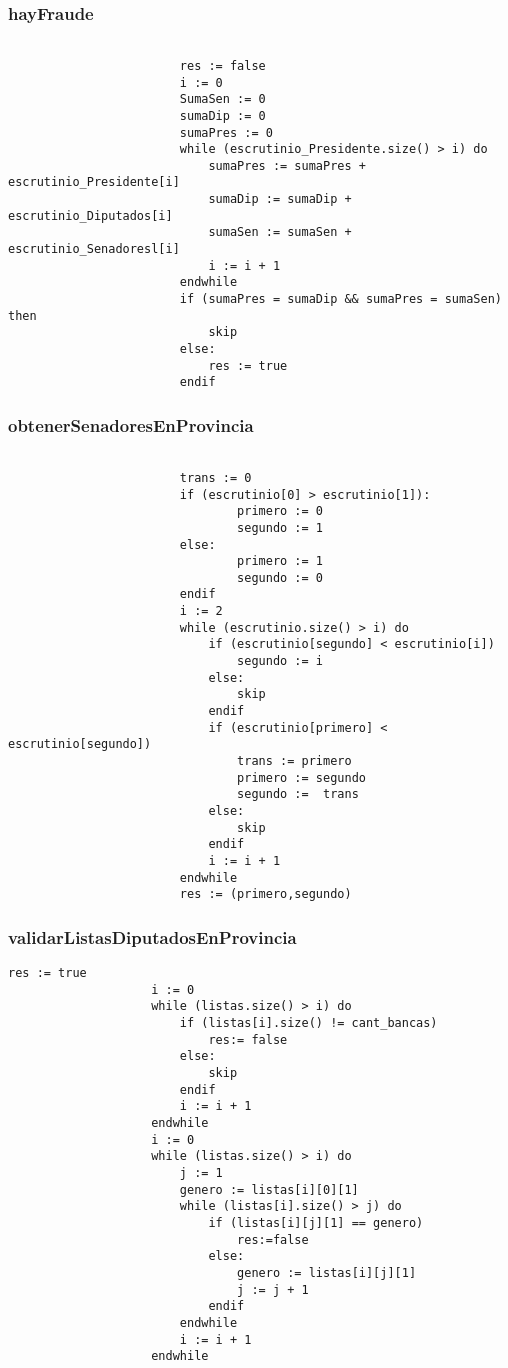 \documentclass[10pt,a4paper]{article}
\begin{document}
		\subsubsection{hayFraude}
			\begin{minipage}[t]{\textwidth}
				\begin{lstlisting}[label=code:for]
    
                        res := false
						i := 0
						SumaSen := 0
						sumaDip := 0
						sumaPres := 0
						while (escrutinio_Presidente.size() > i) do
							sumaPres := sumaPres + escrutinio_Presidente[i]
							sumaDip := sumaDip + escrutinio_Diputados[i]
							sumaSen := sumaSen + escrutinio_Senadoresl[i]
							i := i + 1
						endwhile
						if (sumaPres = sumaDip && sumaPres = sumaSen) then 
							skip
						else:
							res := true
						endif
				\end{lstlisting}
			\end{minipage}

		\subsubsection{obtenerSenadoresEnProvincia}
			\begin{minipage}[t]{\textwidth}
				\begin{lstlisting}[label=code:for]

						trans := 0
						if (escrutinio[0] > escrutinio[1]):
    							primero := 0
    							segundo := 1
						else:
    							primero := 1
    							segundo := 0
						endif
						i := 2
						while (escrutinio.size() > i) do
							if (escrutinio[segundo] < escrutinio[i])
								segundo := i
							else:
								skip
							endif
							if (escrutinio[primero] < escrutinio[segundo])
								trans := primero
								primero := segundo
								segundo :=  trans
							else:
								skip
							endif
							i := i + 1
						endwhile	
						res := (primero,segundo)
				\end{lstlisting}
			\end{minipage}
	
		\subsubsection{validarListasDiputadosEnProvincia}
			\begin{minipage}[t]{\textwidth}
				\begin{lstlisting}[label=code:for]
					res := true
					i := 0
					while (listas.size() > i) do
						if (listas[i].size() != cant_bancas) 
							res:= false
						else:
							skip
						endif
						i := i + 1
					endwhile
					i := 0
					while (listas.size() > i) do
                        j := 1
						genero := listas[i][0][1]
						while (listas[i].size() > j) do
							if (listas[i][j][1] == genero) 
								res:=false
							else:
								genero := listas[i][j][1]
								j := j + 1
							endif
					    endwhile
						i := i + 1
					endwhile
				\end{lstlisting}
			\end{minipage}
		
\end{document}
